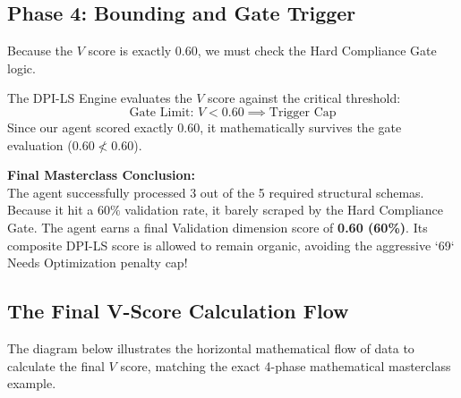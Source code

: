 \documentclass[11pt,a4paper]{article}
\begin{document}
\vspace{0.5cm}

\subsection{Phase 4: Bounding and Gate Trigger}

Because the $V$ score is exactly $0.60$, we must check the Hard Compliance Gate logic.

\begin{tcolorbox}[enhanced, colback=dpigreen!5!white, colframe=dpigreen, title={\textbf{Phase 4: The Hard Gate Evaluation}}, fonttitle=\bfseries]
The DPI-LS Engine evaluates the $V$ score against the critical threshold:
\[
\text{Gate Limit: } V < 0.60 \implies \text{Trigger Cap}
\]
Since our agent scored exactly $0.60$, it mathematically survives the gate evaluation ($0.60 \not< 0.60$). 

\vspace{0.2cm}
\textbf{Final Masterclass Conclusion:} \\
The agent successfully processed 3 out of the 5 required structural schemas. Because it hit a $60\%$ validation rate, it barely scraped by the Hard Compliance Gate. The agent earns a final Validation dimension score of \textbf{0.60 (60\%)}. Its composite DPI-LS score is allowed to remain organic, avoiding the aggressive `69` Needs Optimization penalty cap!
\end{tcolorbox}

\newpage

\subsection{The Final V-Score Calculation Flow}

The diagram below illustrates the horizontal mathematical flow of data to calculate the final $V$ score, matching the exact 4-phase mathematical masterclass example.
\end{document}
